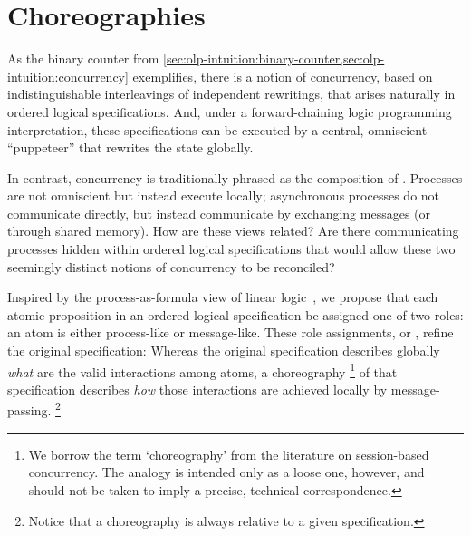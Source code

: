 


% 

% 

\section{Choreographies}\label{sec:choreographies}

As the binary counter from \cref{sec:olp-intuition:binary-counter,sec:olp-intuition:concurrency} exemplifies, there is a notion of concurrency, based on indistinguishable interleavings of independent rewritings, that arises naturally in ordered logical specifications.
And, under a forward-chaining logic programming interpretation, these specifications can be executed by a central, omniscient \enquote{puppeteer} that rewrites the state globally.

In contrast, concurrency is traditionally phrased as the composition of .
Processes are not omniscient but instead execute locally; asynchronous processes do not communicate directly, but instead communicate by exchanging messages (or through shared memory).
How are these views related?
Are there communicating processes hidden within ordered logical specifications that would allow these two seemingly distinct notions of concurrency to be reconciled?

Inspired by the process-as-formula view of linear logic~\autocites{Miller:ELP92}{Cervesato+Scedrov:IC09}, we propose that each atomic proposition in an ordered logical specification %
be assigned one of two roles:
an atom is either process-like or message-like.
These role assignments, or , refine the original specification: 
Whereas the original specification describes globally \emph{what} are the valid interactions among atoms, a choreography%
\footnote{We borrow the term \enquote*{choreography} from the literature on session-based concurrency.
The analogy is intended only as a loose one, however, and should not be taken to imply a precise, technical correspondence.}
of that specification describes \emph{how} those interactions are achieved locally by message-passing.%
\footnote{Notice that a choreography is always relative to a given specification.}

